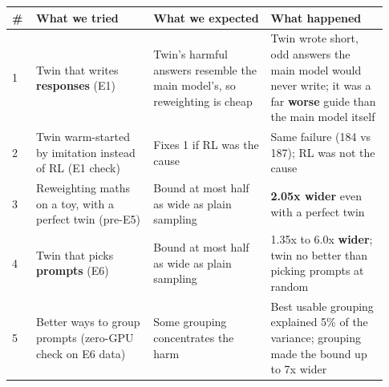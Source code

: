 \documentclass[11pt]{article}
\begin{document}
\begingroup\footnotesize\setlength{\tabcolsep}{4pt}
\begin{longtable}{@{}>{\raggedright\arraybackslash}p{0.059\linewidth}>{\raggedright\arraybackslash}p{0.290\linewidth}>{\raggedright\arraybackslash}p{0.290\linewidth}>{\raggedright\arraybackslash}p{0.290\linewidth}@{}}
\toprule
\textbf{\hspace{0pt}\#} & \textbf{\hspace{0pt}What we tried} & \textbf{\hspace{0pt}What we expected} & \textbf{\hspace{0pt}What happened} \\
\midrule
\endhead
\bottomrule
\endlastfoot
\hspace{0pt}1 & \hspace{0pt}Twin that writes \textbf{responses} (E1) & \hspace{0pt}Twin's harmful answers resemble the main model's, so reweighting is cheap & \hspace{0pt}Twin wrote short, odd answers the main model would never write; it was a far \textbf{worse} guide than the main model itself \\
\hspace{0pt}2 & \hspace{0pt}Twin warm-started by imitation instead of RL (E1 check) & \hspace{0pt}Fixes 1 if RL was the cause & \hspace{0pt}Same failure (184 vs 187); RL was not the cause \\
\hspace{0pt}3 & \hspace{0pt}Reweighting maths on a toy, with a perfect twin (pre-E5) & \hspace{0pt}Bound at most half as wide as plain sampling & \hspace{0pt}\textbf{2.05x wider} even with a perfect twin \\
\hspace{0pt}4 & \hspace{0pt}Twin that picks \textbf{prompts} (E6) & \hspace{0pt}Bound at most half as wide as plain sampling & \hspace{0pt}1.35x to 6.0x \textbf{wider}; twin no better than picking prompts at random \\
\hspace{0pt}5 & \hspace{0pt}Better ways to group prompts (zero-GPU check on E6 data) & \hspace{0pt}Some grouping concentrates the harm & \hspace{0pt}Best usable grouping explained 5\% of the variance; grouping made the bound up to 7x wider \\

\end{longtable}
\end{document}

